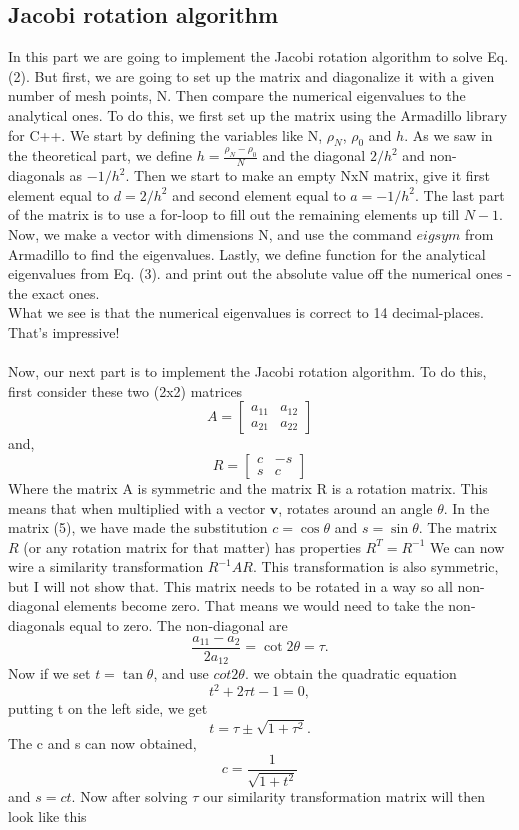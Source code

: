 \documentclass{article}
\begin{document}
\subsection{Jacobi rotation algorithm} In this part we are going to implement the Jacobi rotation algorithm to solve Eq. (2). But first, we are going to set up the matrix and diagonalize it with a given number of mesh points, N. Then compare the numerical eigenvalues to the analytical ones. To do this, we first set up the matrix using the Armadillo library for C++. We start by defining the variables like N, $\rho_N$, $\rho_0$ and $h$. As we saw in the theoretical part, we define $h=\frac{\rho_N-\rho_0}{N}$ and the diagonal $2/h^2$ and non-diagonals as $-1/h^2$. Then we start to make an empty NxN matrix, give it first element equal to $d=2/h^2$ and second element equal to $a=-1/h^2$. The last part of the matrix is to use a for-loop to fill out the remaining elements up till $N-1$. \\
Now, we make a vector with dimensions N, and use the command $\textit{eigsym}$ from Armadillo to find the eigenvalues. Lastly, we define function for the analytical eigenvalues from Eq. (3). and print out the absolute value off the numerical ones - the exact ones. \\
What we see is that the numerical eigenvalues is correct to 14 decimal-places. That's impressive! \\ \\
Now, our next part is to implement the Jacobi rotation algorithm. To do this, first consider these two (2x2) matrices
\begin{equation}
A = \begin{bmatrix}
a_{11} & a_{12} \\
a_{21} & a_{22}
\end{bmatrix}
\end{equation}
and,
\begin{equation}
R = \begin{bmatrix}
c & -s \\
s & c
\end{bmatrix}
\end{equation}
Where the matrix A is symmetric and the matrix R is a rotation matrix. This means that when multiplied with a vector $\mathbf{v}$, rotates around an angle $\theta$. In the matrix (5), we have made the substitution $c=\cos{\theta}$ and $s=\sin{\theta}$. The matrix $R$ (or any rotation matrix for that matter) has properties $R^T=R^{-1}$ We can now wire a similarity transformation $R^{-1}AR$. This transformation is also symmetric, but I will not show that. This matrix needs to be rotated in a way so all non-diagonal elements become zero. That means we would need to take the non-diagonals equal to zero. The non-diagonal are $$\frac{a_{11}-a_{2}}{2a_{12}}=\cot{2\theta}=\tau.$$ Now if we set $t=\tan{\theta}$, and use $cot{2\theta}$. we obtain the quadratic equation $$t^2 + 2\tau t -1 = 0,$$ putting t on the left side, we get $$t=\tau \pm \sqrt{1+\tau^2}.$$ The c and s can now obtained,$$c=\frac{1}{\sqrt{1+t^2}}$$ and $s=ct$. Now after solving $\tau$ our similarity transformation matrix will then look like this
\end{document}
